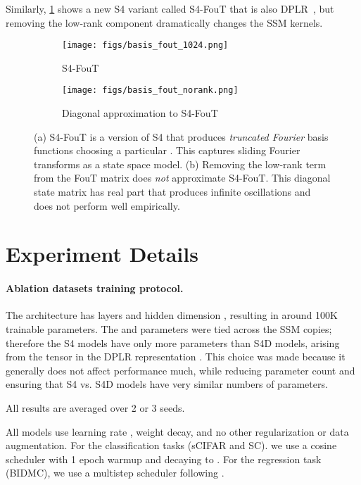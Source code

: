 \documentclass{article}
\begin{document}
Similarly, \cref{fig:basis-fout} shows a new S4 variant called S4-FouT that is also DPLR~\citep{gu2022hippo}, but removing the low-rank component dramatically changes the SSM kernels.

\begin{figure}[!ht]
\begin{subfigure}{.5\linewidth}\centering
  \texttt{[image: figs/basis\_fout\_1024.png]}
  \caption{S4-FouT}
  \label{fig:basis-fout}
\end{subfigure}
\begin{subfigure}{.5\linewidth}\centering
  \texttt{[image: figs/basis\_fout\_norank.png]}
  \caption{Diagonal approximation to S4-FouT}
  \label{fig:basis-fourier-norank}
\end{subfigure}
\caption{
  (a) S4-FouT is a version of S4 that produces \emph{truncated Fourier} basis functions choosing a particular . This captures sliding Fourier transforms as a state space model.
  (b) Removing the low-rank term from the FouT matrix does \emph{not} approximate S4-FouT. This diagonal state matrix has real part  that produces infinite oscillations and does not perform well empirically.
}
\label{fig:basis-fourier}
\end{figure}
  \section{Experiment Details}
\label{sec:experiment-details}

\paragraph{Ablation datasets training protocol.}

The architecture has  layers and hidden dimension , resulting in around 100K trainable parameters.
The  and  parameters were tied across the  SSM copies; therefore the S4 models have only  more parameters than S4D models, arising from the  tensor in the DPLR representation .
This choice was made because it generally does not affect performance much, while reducing parameter count and ensuring that S4 vs. S4D models have very similar numbers of parameters.

All results are averaged over 2 or 3 seeds.

All models use learning rate ,  weight decay, and no other regularization or data augmentation.
For the classification tasks (sCIFAR and SC).
we use a cosine scheduler with 1 epoch warmup and decaying to .
For the regression task (BIDMC), we use a multistep scheduler following \citep{rusch2021unicornn,gu2021lssl}.
\end{document}
